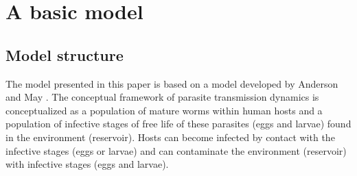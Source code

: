 \documentclass[12pt,a4paper]{article}
\theoremstyle{plain}%
\theoremstyle{definition}
\theoremstyle{remark}
\begin{document}
	
\section{A basic model}
\label{s:basicmodel}
\subsection{Model structure}
\label{ss:structure}
The model presented in this paper is based on a model developed by Anderson and May \citep{anderson1992infectious,anderson1985helminth}.
The conceptual framework of parasite transmission dynamics is conceptualized as a population of mature worms within human hosts and a population of infective stages of free life of these parasites (eggs and larvae) found in the environment (reservoir).
Hosts can become infected by contact with the infective stages (eggs or larvae) and can contaminate the environment (reservoir) with infective stages (eggs and larvae).
\end{document}

